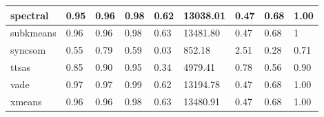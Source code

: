 \begin{table}[H]
\begin{tabular}{|l|l|l|l|l|l|l|l|l|}
\hline
spectral & 0.95 & 0.96 & 0.98 & 0.62 & 13038.01 & 0.47 & 0.68 & 1.00 \\
\hline
subkmeans & 0.96 & 0.96 & 0.98 & 0.63 & 13481.80 & 0.47 & 0.68 & 1 \\
\hline
syncsom & 0.55 & 0.79 & 0.59 & 0.03 & 852.18 & 2.51 & 0.28 & 0.71 \\
\hline
ttsas & 0.85 & 0.90 & 0.95 & 0.34 & 4979.41 & 0.78 & 0.56 & 0.90 \\
\hline
vade & 0.97 & 0.97 & 0.99 & 0.62 & 13194.78 & 0.47 & 0.68 & 1.00 \\
\hline
xmeans & 0.96 & 0.96 & 0.98 & 0.63 & 13480.91 & 0.47 & 0.68 & 1.00 \\
\hline
\end{tabular}
\end{table}